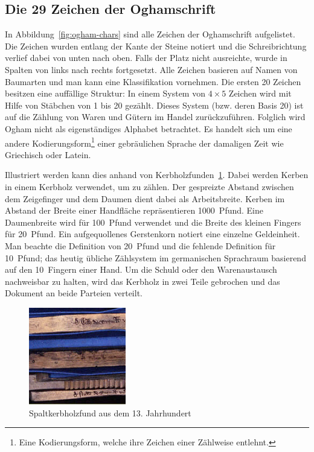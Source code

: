 \documentclass[a4paper]{scrartcl}
\begin{document}
\subsection{Die 29 Zeichen der Oghamschrift}
%
In Abbildung~\ref{fig:ogham-chars} sind alle Zeichen der Oghamschrift aufgelistet. Die Zeichen wurden entlang der Kante der Steine notiert und die Schreibrichtung verlief dabei von unten nach oben. Falls der Platz nicht ausreichte, wurde in Spalten von links nach rechts fortgesetzt. Alle Zeichen basieren auf Namen von Baumarten und man kann eine Klassifikation vornehmen. Die ersten 20 Zeichen besitzen eine auffällige Struktur: In einem System von $4\times 5$ Zeichen wird mit Hilfe von Stäbchen von 1 bis 20 gezählt. Dieses System (bzw. deren Basis 20) ist auf die Zählung von Waren und Gütern im Handel zurückzuführen. Folglich wird Ogham nicht als eigenständiges Alphabet betrachtet. Es handelt sich um eine andere Kodierungsform\footnote{Eine Kodierungsform, welche ihre Zeichen einer Zählweise entlehnt.} einer gebräulichen Sprache der damaligen Zeit wie Griechisch oder Latein. 

Illustriert werden kann dies anhand von Kerbholzfunden~\ref{fig:tally-stick}. Dabei werden Kerben in einem Kerbholz verwendet, um zu zählen. Der gespreizte Abstand zwischen dem Zeigefinger und dem Daumen dient dabei als Arbeitsbreite. Kerben im Abstand der Breite einer Handfläche repräsentieren 1000~Pfund. Eine Daumenbreite wird für 100~Pfund verwendet und die Breite des kleinen Fingers für 20~Pfund. Ein aufgequollenes Gerstenkorn notiert eine einzelne Geldeinheit. Man beachte die Definition von 20~Pfund und die fehlende Definition für 10~Pfund; das heutig übliche Zählsystem im germanischen Sprachraum basierend auf den 10~Fingern einer Hand. Um die Schuld oder den Warenaustausch nachweisbar zu halten, wird das Kerbholz in zwei Teile gebrochen und das \glqq Dokument\grqq{} an beide Parteien verteilt.

\begin{figure}[t]
  \begin{center}
    \includegraphics[width=120pt,height=120pt]{images/tally_stick.jpg}
    \caption{Spaltkerbholzfund aus dem 13. Jahrhundert~\cite{tally-sticks}}
    \label{fig:tally-stick}
  \end{center}
\end{figure}
\end{document}
